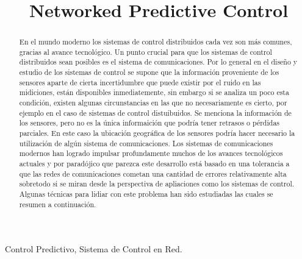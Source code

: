 \documentclass[conference]{IEEEtran}
\begin{document}
\title{Networked Predictive Control\\
}

\author{
}

\maketitle

\begin{abstract}
En el mundo moderno los sistemas de control distribuidos cada vez son más comunes, gracias al avance tecnológico. Un punto crucial para que  los sistemas de control distribuidos sean posibles es el sistema de comunicaciones. Por lo general en el diseño y estudio de los sistemas de control se supone que la información proveniente de los sensores aparte de cierta incertidumbre que puede existir por el ruido en las midiciones, están disponibles inmediatemente, sin embargo si se analiza un poco esta condición, existen algunas circunstancias en las que no necesariamente es cierto, por ejemplo en el caso de sistemas de control distuibuidos. Se menciona la información de los sensores, pero no es la única informaición que podría tener retrasos o pérdidas parciales. En este caso la ubicación geográfica de los sensores podría hacer necesario la utilización de algún sistema de comunicaciones. Los sistemas de comunicaciones modernos han logrado impulsar profundamente muchos de los avances tecnológicos actuales y por paradójico que parezca este desarrollo está basado en una tolerancia a que las redes de comunicaciones cometan una cantidad de errores relativamente alta sobretodo si se miran desde la perspectiva de apliaciones como los sistemas de control. Algunas técnicas para lidiar con este problema han sido estudiadas las cuales se resumen a continuación. 
\end{abstract}

\begin{IEEEkeywords}
Control Predictivo, Sistema de Control en Red.
\end{IEEEkeywords}
\end{document}
